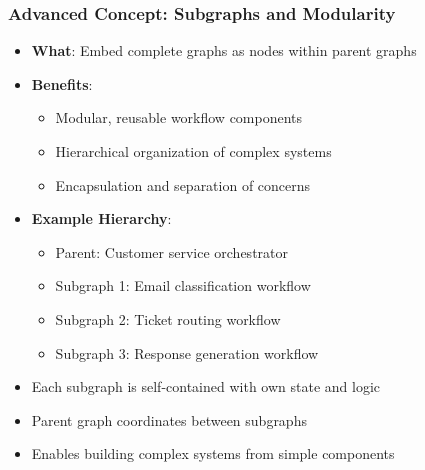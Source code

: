 \begin{frame}[fragile]\frametitle{Advanced Concept: Subgraphs and Modularity}
      \begin{itemize}
        \item \textbf{What}: Embed complete graphs as nodes within parent graphs
        \item \textbf{Benefits}:
        \begin{itemize}
            \item Modular, reusable workflow components
            \item Hierarchical organization of complex systems
            \item Encapsulation and separation of concerns
        \end{itemize}
        \item \textbf{Example Hierarchy}:
        \begin{itemize}
            \item Parent: Customer service orchestrator
            \item Subgraph 1: Email classification workflow
            \item Subgraph 2: Ticket routing workflow
            \item Subgraph 3: Response generation workflow
        \end{itemize}
        \item Each subgraph is self-contained with own state and logic
        \item Parent graph coordinates between subgraphs
        \item Enables building complex systems from simple components
      \end{itemize}
\end{frame}

